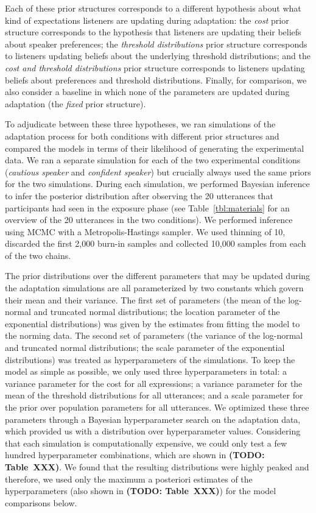 \documentclass[lucida,biblatex]{sp} %
\newcommand{\todo}[1]{}
\renewcommand{\todo}[1]{{\bf \color{red} (TODO: {#1})}}
\begin{document}
Each of these prior structures corresponds to a different hypothesis about what kind of expectations listeners are updating during adaptation: the {\it cost} prior structure corresponds to the hypothesis that listeners are updating their beliefs about speaker preferences; the {\it threshold distributions} prior structure corresponds to listeners updating beliefs about the underlying threshold distributions; and the {\it cost and threshold distributions} prior structure corresponds to listeners updating beliefs about preferences and threshold distributions. Finally, for comparison, we also consider a baseline in which none of the parameters are updated during adaptation (the {\it fixed} prior structure). 

To adjudicate between these three hypotheses, we ran simulations of the adaptation process for both conditions with different prior structures and compared the models in terms of their likelihood of generating the experimental data.
We ran a separate simulation for each of the two experimental conditions (\textit{cautious speaker} and \textit{confident speaker})  but crucially always used the same priors for the two simulations. During each simulation, we performed Bayesian inference to infer the posterior distribution after observing the 20 utterances that participants had seen in the exposure phase (see Table~\ref{tbl:materials} for an overview of the 20 utterances in the two conditions). We performed inference using MCMC with a Metropolis-Hastings sampler. We used thinning of 10, discarded the first 2,000 burn-in samples and collected 10,000 samples from each of the two chains.

The prior distributions over the different parameters that may be updated during the adaptation simulations are all parameterized by two constants which govern their mean and their variance. The first set of parameters (the mean of the log-normal and truncated normal distributions; the location parameter of the exponential distributions) was given by the estimates from fitting the model to the norming data. The second set of parameters (the variance of the log-normal and truncated normal distributions; the scale parameter of the exponential distributions) was treated as hyperparameters of the simulations. To keep the model as simple as possible, we only used three hyperparameters in total: a variance parameter for the cost for all expressions; a variance parameter for the mean of the threshold distributions for all utterances; and a scale parameter for the prior over population parameters for all utterances. We optimized these three parameters through a Bayesian hyperparameter search on the adaptation data, which provided us with a distribution over hyperparameter values. Considering that each simulation is computationally expensive, we could only test a few hundred hyperparameter combinations, which are shown in \todo{Table~XXX}. We found that the resulting distributions were highly peaked and therefore, we used only the maximum a posteriori estimates of the hyperparameters (also shown in \todo{Table~XXX}) for the model comparisons below.
\end{document}
